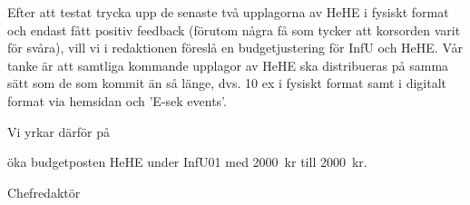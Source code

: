 \documentclass[../_main/handlingar.tex]{subfiles}
\begin{document}

Efter att testat trycka upp de senaste två upplagorna av HeHE i fysiskt format
och endast fått positiv feedback (förutom några få som tycker att korsorden varit
för svåra), vill vi i redaktionen föreslå en budgetjustering för InfU och HeHE.
Vår tanke är att samtliga kommande upplagor av HeHE ska distribueras på
samma sätt som de som kommit än så länge, dvs. 10 ex i fysiskt format samt i
digitalt format via hemsidan och 'E-sek events'. 

Vi yrkar därför på
\begin{attsatser}
    \att öka budgetposten HeHE under InfU01 med \SI{2000}{kr} till \SI{2000}{kr}.
\end{attsatser}

\begin{signatures}{1}
    \mvh 
    \signature{Max Mauritsson}{Chefredaktör}
\end{signatures}
\end{document}
